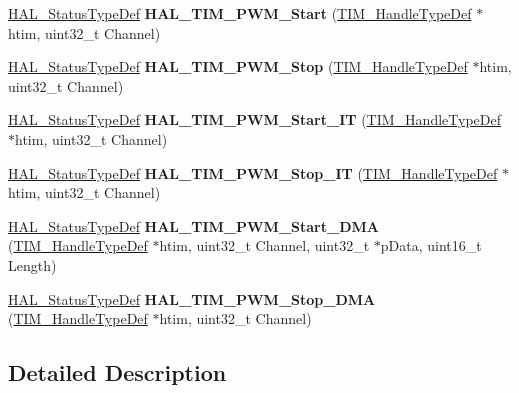 \begin{DoxyCompactItemize}
\mbox{\hyperlink{stm32f4xx__hal__def_8h_a63c0679d1cb8b8c684fbb0632743478f}{H\+A\+L\+\_\+\+Status\+Type\+Def}} {\bfseries H\+A\+L\+\_\+\+T\+I\+M\+\_\+\+P\+W\+M\+\_\+\+Start} (\mbox{\hyperlink{struct_t_i_m___handle_type_def}{T\+I\+M\+\_\+\+Handle\+Type\+Def}} $\ast$htim, uint32\+\_\+t Channel)
\item 
\mbox{\label{group___t_i_m___exported___functions___group3_gae087011858379feeb770ecb4568829d3}} 
\mbox{\hyperlink{stm32f4xx__hal__def_8h_a63c0679d1cb8b8c684fbb0632743478f}{H\+A\+L\+\_\+\+Status\+Type\+Def}} {\bfseries H\+A\+L\+\_\+\+T\+I\+M\+\_\+\+P\+W\+M\+\_\+\+Stop} (\mbox{\hyperlink{struct_t_i_m___handle_type_def}{T\+I\+M\+\_\+\+Handle\+Type\+Def}} $\ast$htim, uint32\+\_\+t Channel)
\item 
\mbox{\label{group___t_i_m___exported___functions___group3_gaca1f5fbc35101d0fc7e8af31c9a0c26c}} 
\mbox{\hyperlink{stm32f4xx__hal__def_8h_a63c0679d1cb8b8c684fbb0632743478f}{H\+A\+L\+\_\+\+Status\+Type\+Def}} {\bfseries H\+A\+L\+\_\+\+T\+I\+M\+\_\+\+P\+W\+M\+\_\+\+Start\+\_\+\+IT} (\mbox{\hyperlink{struct_t_i_m___handle_type_def}{T\+I\+M\+\_\+\+Handle\+Type\+Def}} $\ast$htim, uint32\+\_\+t Channel)
\item 
\mbox{\label{group___t_i_m___exported___functions___group3_ga0559af125dc5fb2bb183a6a4b86808b5}} 
\mbox{\hyperlink{stm32f4xx__hal__def_8h_a63c0679d1cb8b8c684fbb0632743478f}{H\+A\+L\+\_\+\+Status\+Type\+Def}} {\bfseries H\+A\+L\+\_\+\+T\+I\+M\+\_\+\+P\+W\+M\+\_\+\+Stop\+\_\+\+IT} (\mbox{\hyperlink{struct_t_i_m___handle_type_def}{T\+I\+M\+\_\+\+Handle\+Type\+Def}} $\ast$htim, uint32\+\_\+t Channel)
\item 
\mbox{\label{group___t_i_m___exported___functions___group3_gaa4b542b3c0ae347ea580c9e7c8e88b17}} 
\mbox{\hyperlink{stm32f4xx__hal__def_8h_a63c0679d1cb8b8c684fbb0632743478f}{H\+A\+L\+\_\+\+Status\+Type\+Def}} {\bfseries H\+A\+L\+\_\+\+T\+I\+M\+\_\+\+P\+W\+M\+\_\+\+Start\+\_\+\+D\+MA} (\mbox{\hyperlink{struct_t_i_m___handle_type_def}{T\+I\+M\+\_\+\+Handle\+Type\+Def}} $\ast$htim, uint32\+\_\+t Channel, uint32\+\_\+t $\ast$p\+Data, uint16\+\_\+t Length)
\item 
\mbox{\label{group___t_i_m___exported___functions___group3_gad77367f9b8d8d17842a913f7d6ce274b}} 
\mbox{\hyperlink{stm32f4xx__hal__def_8h_a63c0679d1cb8b8c684fbb0632743478f}{H\+A\+L\+\_\+\+Status\+Type\+Def}} {\bfseries H\+A\+L\+\_\+\+T\+I\+M\+\_\+\+P\+W\+M\+\_\+\+Stop\+\_\+\+D\+MA} (\mbox{\hyperlink{struct_t_i_m___handle_type_def}{T\+I\+M\+\_\+\+Handle\+Type\+Def}} $\ast$htim, uint32\+\_\+t Channel)
\end{DoxyCompactItemize}


\subsection{Detailed Description}
